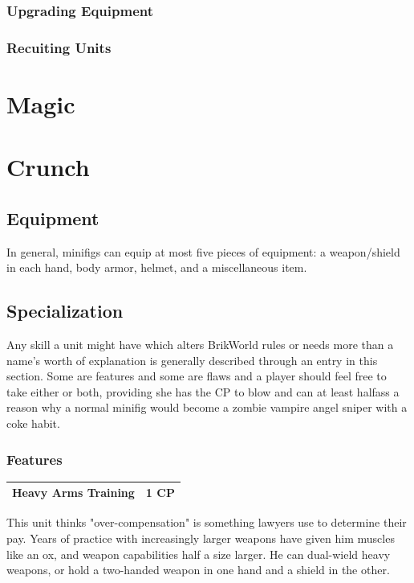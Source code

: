\documentclass[12pt,a4paper,twocolumn]{article}
\begin{document}
\subsubsection{Upgrading Equipment}

\subsubsection{Recuiting Units}

\section {Magic}

\section {Crunch}
\subsection{Equipment}

In general, minifigs can equip at most five pieces of equipment: a weapon/shield in each hand, body armor, helmet, and a miscellaneous item.  

\subsection{Specialization}

Any skill a unit might have which alters BrikWorld rules or needs more than a name's worth of explanation is generally described through an entry in this section.  Some are features and some are flaws and a player should feel free to take either or both, providing she has the CP to blow and can at least halfass a reason why a normal minifig would become a zombie vampire angel sniper with a coke habit.

\subsubsection{Features}

\begin{tabular}{|l|c|} \hline
Heavy Arms Training & 1 CP \\ \hline
\end{tabular}

This unit thinks "over-compensation" is something lawyers use to determine their pay.  Years of practice with increasingly larger weapons have given him muscles like an ox, and weapon capabilities half a size larger.  He can dual-wield heavy weapons, or hold a two-handed weapon in one hand and a shield in the other.
\end{document}
